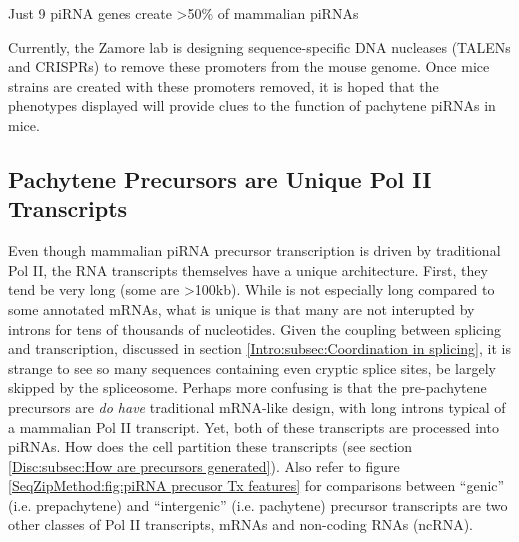     \begin{table} %
      \caption{Just 9 piRNA genes create >50\% of mammalian piRNAs}
      \label{SeqZipMethod:tab:matchedClusterValues}
      \end{table}
    

    Currently, the Zamore lab is designing sequence-specific DNA nucleases (TALENs and CRISPRs) to remove these promoters from the mouse genome. Once mice strains are created with these promoters removed, it is hoped that the phenotypes displayed will provide clues to the function of pachytene piRNAs in mice.

  \subsection{Pachytene Precursors are Unique Pol II Transcripts}
    \label{SeqZipMethod:subsec:pachytene Tx are different}

    Even though mammalian piRNA precursor transcription is driven by traditional Pol II, the RNA transcripts themselves have a unique architecture. First, they tend be very long (some are >100kb). While is not especially long compared to some annotated mRNAs, what is unique is that many are not interupted by introns for tens of thousands of nucleotides. Given the coupling between splicing and transcription, discussed in section \ref{Intro:subsec:Coordination in splicing}, it is strange to see so many sequences containing even cryptic splice sites, be largely skipped by the spliceosome. Perhaps more confusing is that the pre-pachytene precursors are \textit{do have} traditional mRNA-like design, with long introns typical of a mammalian Pol II transcript. Yet, both of these transcripts are processed into piRNAs. How does the cell partition these transcripts (see section \ref{Disc:subsec:How are precursors generated}). Also refer to figure \ref{SeqZipMethod:fig:piRNA precusor Tx features} for comparisons between ``genic'' (i.e. prepachytene) and ``intergenic'' (i.e. pachytene) precursor transcripts are two other classes of Pol II transcripts, mRNAs and non-coding RNAs (ncRNA).

